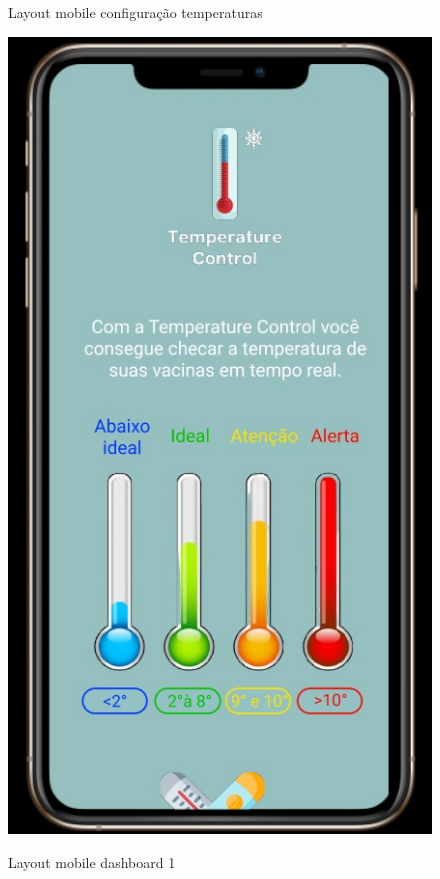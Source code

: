     \begin{figure}
        \centering
        \begin{minipage}{0.5\textwidth}
            \caption{Layout mobile configuração temperaturas}
            \centering
            \includegraphics[height=0.4\textheight]{img/mobile/config_temp.jpeg}
            \label{fig:mobileConfig}
        \end{minipage}%
        \begin{minipage}{0.5\textwidth}
            \caption{Layout mobile dashboard 1}
            \centering

\end{minipage}
\end{figure}
